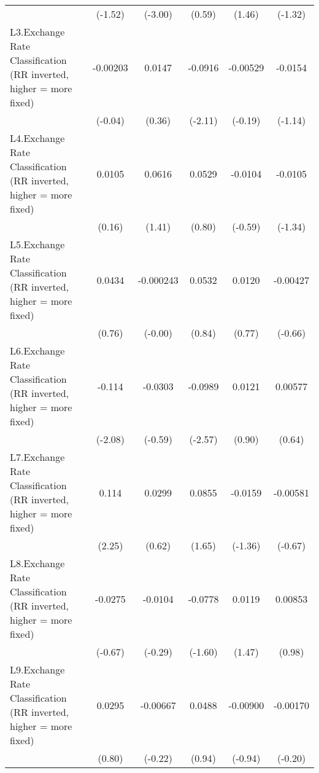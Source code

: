 {\begin{tabular}{l*{5}{c}}
                &  (-1.52)         &  (-3.00)         &   (0.59)         &   (1.46)         &  (-1.32)         \\
[1em]
L3.Exchange Rate Classification (RR inverted, higher = more fixed)& -0.00203         &   0.0147         &  -0.0916\sym{*}  & -0.00529         &  -0.0154         \\
                &  (-0.04)         &   (0.36)         &  (-2.11)         &  (-0.19)         &  (-1.14)         \\
[1em]
L4.Exchange Rate Classification (RR inverted, higher = more fixed)&   0.0105         &   0.0616         &   0.0529         &  -0.0104         &  -0.0105         \\
                &   (0.16)         &   (1.41)         &   (0.80)         &  (-0.59)         &  (-1.34)         \\
[1em]
L5.Exchange Rate Classification (RR inverted, higher = more fixed)&   0.0434         &-0.000243         &   0.0532         &   0.0120         & -0.00427         \\
                &   (0.76)         &  (-0.00)         &   (0.84)         &   (0.77)         &  (-0.66)         \\
[1em]
L6.Exchange Rate Classification (RR inverted, higher = more fixed)&   -0.114\sym{*}  &  -0.0303         &  -0.0989\sym{*}  &   0.0121         &  0.00577         \\
                &  (-2.08)         &  (-0.59)         &  (-2.57)         &   (0.90)         &   (0.64)         \\
[1em]
L7.Exchange Rate Classification (RR inverted, higher = more fixed)&    0.114\sym{*}  &   0.0299         &   0.0855         &  -0.0159         & -0.00581         \\
                &   (2.25)         &   (0.62)         &   (1.65)         &  (-1.36)         &  (-0.67)         \\
[1em]
L8.Exchange Rate Classification (RR inverted, higher = more fixed)&  -0.0275         &  -0.0104         &  -0.0778         &   0.0119         &  0.00853         \\
                &  (-0.67)         &  (-0.29)         &  (-1.60)         &   (1.47)         &   (0.98)         \\
[1em]
L9.Exchange Rate Classification (RR inverted, higher = more fixed)&   0.0295         & -0.00667         &   0.0488         & -0.00900         & -0.00170         \\
                &   (0.80)         &  (-0.22)         &   (0.94)         &  (-0.94)         &  (-0.20)         \\

\end{tabular}}
